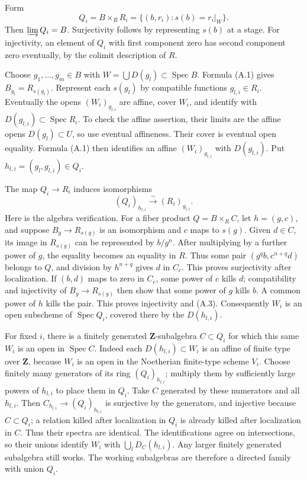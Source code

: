 \documentclass[11pt]{article}
\begin{document}
Form \[
Q_i=B\times_R R_i
=\{(b,r_i):s(b)=r_i|_W\}.
\tag{A.2}
\] Then \(\varinjlim Q_i=B\). Surjectivity follows by representing
\(s(b)\) at a stage. For injectivity, an element of \(Q_i\) with first
component zero has second component zero eventually, by the colimit
description of \(R\).

Choose \(g_1,\ldots,g_m\in B\) with
\(W=\bigcup D(g_l)\subset\operatorname{Spec}B\). Formula (A.1) gives
\(B_{g_l}=R_{s(g_l)}\). Represent each \(s(g_l)\) by compatible
functions \(g_{l,i}\in R_i\). Eventually the opens \((W_i)_{g_{l,i}}\)
are affine, cover \(W_i\), and identify with
\(D(g_{l,i})\subset\operatorname{Spec}R_i\). To check the affine
assertion, their limits are the affine opens \(D(g_l)\subset U\), so use
eventual affineness. Their cover is eventual open equality. Formula
(A.1) then identifies an affine \((W_i)_{g_{l,i}}\) with \(D(g_{l,i})\).
Put \(h_{l,i}=(g_l,g_{l,i})\in Q_i\).

The map \(Q_i\to R_i\) induces isomorphisms \[
(Q_i)_{h_{l,i}}\xrightarrow{\sim}(R_i)_{g_{l,i}}.
\tag{A.3}
\] Here is the algebra verification. For a fiber product
\(Q=B\times_R C\), let \(h=(g,c)\), and suppose \(B_g\to R_{s(g)}\) is
an isomorphism and \(c\) maps to \(s(g)\). Given \(d\in C\), its image
in \(R_{s(g)}\) can be represented by \(b/g^n\). After multiplying by a
further power of \(g\), the equality becomes an equality in \(R\). Thus
some pair \((g^q b,c^{n+q}d)\) belongs to \(Q\), and division by
\(h^{n+q}\) gives \(d\) in \(C_c\). This proves surjectivity after
localization. If \((b,d)\) maps to zero in \(C_c\), some power of \(c\)
kills \(d\); compatibility and injectivity of \(B_g\to R_{s(g)}\) then
show that some power of \(g\) kills \(b\). A common power of \(h\) kills
the pair. This proves injectivity and (A.3). Consequently \(W_i\) is an
open subscheme of \(\operatorname{Spec}Q_i\), covered there by the
\(D(h_{l,i})\).

For fixed \(i\), there is a finitely generated \(\mathbf Z\)-subalgebra
\(C\subset Q_i\) for which this same \(W_i\) is an open in
\(\operatorname{Spec}C\). Indeed each \(D(h_{l,i})\subset W_i\) is an
affine of finite type over \(\mathbf Z\), because \(W_i\) is an open in
the Noetherian finite-type scheme \(V_i\). Choose finitely many
generators of its ring \((Q_i)_{h_{l,i}}\); multiply them by
sufficiently large powers of \(h_{l,i}\) to place them in \(Q_i\). Take
\(C\) generated by these numerators and all \(h_{l,i}\). Then
\(C_{h_{l,i}}\to(Q_i)_{h_{l,i}}\) is surjective by the generators, and
injective because \(C\subset Q_i\); a relation killed after localization
in \(Q_i\) is already killed after localization in \(C\). Thus their
spectra are identical. The identifications agree on intersections, so
their unions identify \(W_i\) with \(\bigcup_lD_C(h_{l,i})\). Any larger
finitely generated subalgebra still works. The working subalgebras are
therefore a directed family with union \(Q_i\).
\end{document}
